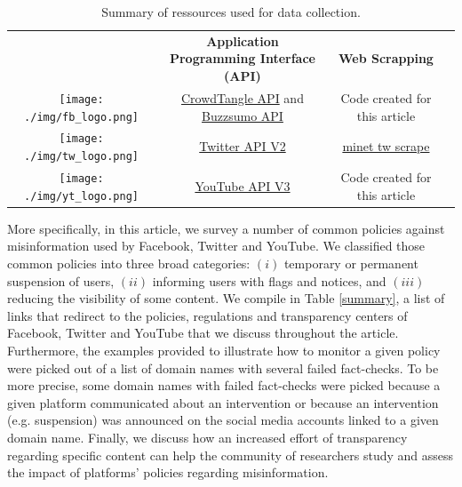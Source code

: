\documentclass{article}
\begin{document}
\begin{table}[h]
\centering
\begin{tabular}{|c|c|c|l}
\cline{1-3}
 & {\bf Application Programming Interface (API)} & {\bf Web Scrapping}  &  \\  \cline{1-3}
\texttt{[image: ./img/fb\_logo.png]}  & \href{https://www.crowdtangle.com}{CrowdTangle API} and \href{https://buzzsumo.com}{Buzzsumo API}  & Code created for this article &  \\ \cline{1-3}
 \texttt{[image: ./img/tw\_logo.png]}  &  \href{https://developer.twitter.com/en/docs/twitter-api/early-access}{Twitter API V2}  & \href{https://github.com/medialab/minet/blob/master/docs/cli.md\#twitter-scrape}{minet tw scrape} &  \\ \cline{1-3}
 \texttt{[image: ./img/yt\_logo.png]} & \href{https://developers.google.com/youtube/v3}{YouTube API V3} & Code created for this article &  \\ \cline{1-3}
\end{tabular}
\caption{Summary of ressources used for data collection.}
\label{tab1}
\end{table}

\smallskip

More specifically, in this article, we survey a number of common policies against misinformation used by Facebook, Twitter and YouTube. We classified those common policies into three broad categories: $(i)$ temporary or permanent suspension of users, $(ii)$ 
informing users with flags and notices, and $(iii)$ reducing the visibility of some content. We compile in Table \ref{summary}, a list of links that redirect to the policies, regulations and transparency centers of Facebook, Twitter and YouTube that we discuss throughout the article. Furthermore, the examples provided to illustrate how to monitor a given policy were picked out of a list of domain names with several failed fact-checks. To be more precise, some domain names with failed fact-checks were picked because a given platform communicated about an intervention or because an intervention (e.g. suspension) was announced on the social media accounts linked to a given domain name. Finally, we discuss how an increased effort of transparency regarding specific content can help the community of researchers study and assess the impact of platforms' policies regarding misinformation. 

\smallskip 




\end{document}

